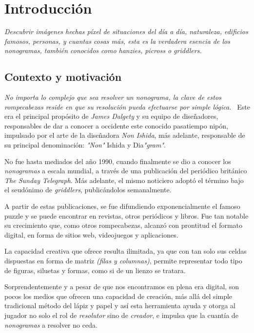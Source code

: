 \chapter{Introducción}

\textit{Descubrir imágenes hechas píxel de situaciones del día a día,
naturaleza, edificios famosos, personas, y cuantas cosas más, esta es la verdadera esencia de
los nonogramas, también conocidos como hanzies, picross o griddlers.}

\section{Contexto y motivación}

\textit{No importa lo complejo que sea resolver un nonograma, la clave de
estos rompecabezas reside en que su resolución pueda efectuarse por simple
lógica.~\cite{dalgety_2017}} Este era el principal propósito de \textit{James Dalgety} y su equipo
de diseñadores, responsables de dar a conocer a occidente este conocido
pasatiempo nipón, impulsado por el arte de la diseñadora \textit{Non Ishida}, más
adelante, responsable de su principal denominación: \textit{"Non"} Ishida y
Dia\textit{"gram"}.

No fue hasta mediados del año 1990, cuando finalmente se dio a conocer los \textit{nonogramas} a escala
mundial, a través de una publicación del periódico británico \textit{The Sunday
Telegraph}. Más adelante, el mismo noticiero adoptó el término bajo el
seudónimo de \textit{griddlers}, publicándolos semanalmente.

A partir de estas publicaciones, se fue difundiendo exponencialmente el famoso puzzle y
se puede encontrar en revistas, otros periódicos y libros. Fue tan notable su
crecimiento que, como otros rompecabezas, alcanzó con prontitud el formato
digital, en forma de sitios web, videojuegos y aplicaciones.

La capacidad creativa que ofrece resulta ilimitada, ya que con tan solo sus
celdas dispuestas en forma de matriz \textit{(filas y columnas)}, permite
representar todo tipo de figuras, siluetas y formas, como si de un lienzo se
tratara. 

Sorprendentemente y a pesar de que nos encontramos en plena era digital, son pocos los
medios que ofrecen una capacidad de creación, más allá del simple
tradicional método del lápiz y papel y así esta herramienta ayuda y otorga al jugador no solo el rol de \textit{resolutor} sino de \textit{creador},
e impulsa que la cuantía de \textit{nonogramas} a resolver no ceda.

